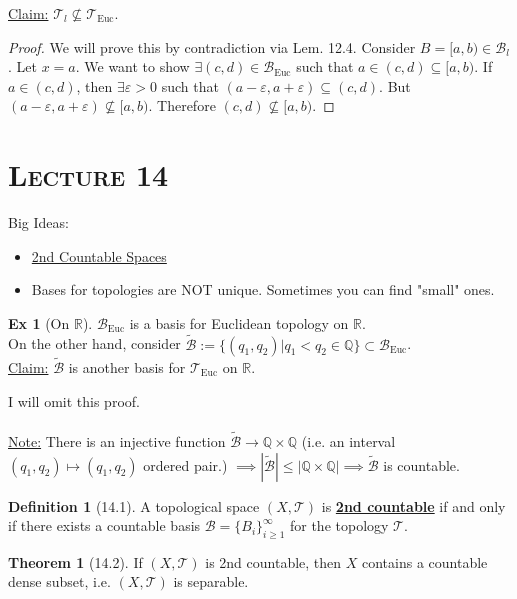\documentclass{article}
\newcommand{\R}{\ensuremath{\mathbb{R}}}
\newcommand{\Q}{\ensuremath{\mathbb{Q}}}
\newcommand{\B}{\ensuremath{\mathcal{B}}}
\newcommand{\Iff}{if and only if}
\newcommand{\define}[1]{\textbf{\underline{#1}}}
\newcommand{\ts}{topological space}
\newcommand{\tp}{\ensuremath{\mathcal{T}}}
\newcommand{\Ts}[2]{\ensuremath{(#1,#2)}}
\newcommand{\tpeuc}{\ensuremath{\tp_\text{Euc}}}
\newcommand{\Beuc}{\ensuremath{\B_\text{Euc}}}
\renewcommand{\Subset}{\subseteq}
\theoremstyle{definition}
\newtheorem*{defn}{Definition}
\newtheorem*{thm}{Theorem}
\newtheorem*{ex}{Ex}
\theoremstyle{remark}
\begin{document}
        \noindent\underline{Claim:} $\tp_l \not\subseteq \tpeuc$.
        
        \begin{proof}
            We will prove this by contradiction via Lem. 12.4. Consider $B=[a,b) \in \B_l$. Let $x=a$. We want to show $\exists(c,d) \in \Beuc$ such that $a\in(c,d) \Subset [a,b)$. If $a \in (c,d)$, then $\exists \varepsilon > 0$ such that $(a-\varepsilon,a+\varepsilon) \Subset (c,d)$. But $(a-\varepsilon,a+\varepsilon) \not\subseteq [a,b)$. Therefore $(c,d) \not\subseteq [a,b)$.
        \end{proof}
        
    \noindent\section*{\textbf{\textsc{Lecture 14}}}
        Big Ideas: 
        \begin{itemize}
            \item \underline{2nd Countable Spaces}
            \item Bases for topologies are NOT unique. Sometimes you can find "small" ones.
        \end{itemize}
    
        \begin{ex}[On \R]
            $\Beuc$ is a basis for Euclidean topology on $\R$.\\
            On the other hand, consider $\widetilde{\B} := \{(q_1,q_2)| q_1<q_2 \in \Q\} \subset \Beuc$.\\
            \underline{Claim:} $\widetilde{\B}$ is another basis for $\tpeuc$ on $\R$.
        \end{ex}
    
        I will omit this proof.\\\\
        \underline{Note:} There is an injective function $\widetilde{\B} \to \Q \times \Q$ (i.e. an interval $(q_1,q_2) \mapsto (q_1,q_2)$ ordered pair.) $\implies |\widetilde{\B}| \leq |\Q\times\Q| \implies \widetilde{\B}$ is countable.
        
        \begin{defn}[14.1]
            A \ts{} $\Ts{X}{\tp}$ is \define{2nd countable} \Iff{} there exists a countable basis $\B=\{B_i\}_{i\geq 1}^\infty$ for the topology $\tp$.
        \end{defn}
        
        \begin{thm}[14.2]
            If $\Ts{X}{\tp}$ is 2nd countable, then $X$ contains a countable dense subset, i.e. $\Ts{X}{\tp}$ is separable.
        \end{thm}
        
\end{document}
